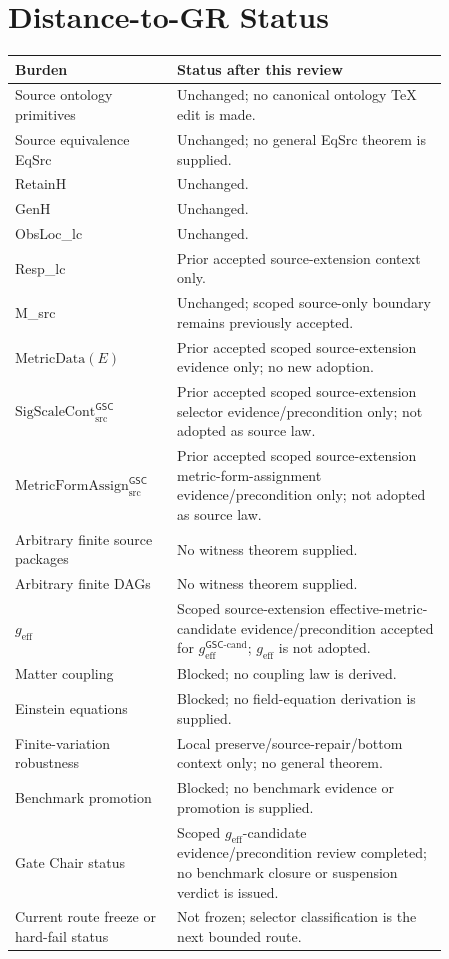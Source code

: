 \documentclass[11pt]{article}
\newcommand{\SigScaleCont}{\mathrm{SigScaleCont}^{\mathsf{GSC}}_{\mathrm{src}}}
\newcommand{\MetricFormAssign}{\mathrm{MetricFormAssign}^{\mathsf{GSC}}_{\mathrm{src}}}
\newcommand{\geff}{g_{\mathrm{eff}}}
\newcommand{\geffCand}{g_{\mathrm{eff}}^{\mathsf{GSC}\mbox{-}\mathrm{cand}}}
\begin{document}
\section{Distance-to-GR Status}

\begin{longtable}{p{0.30\linewidth}p{0.56\linewidth}}
\toprule
Burden & Status after this review \\
\midrule
Source ontology primitives & Unchanged; no canonical ontology TeX edit is made. \\
Source equivalence EqSrc & Unchanged; no general EqSrc theorem is supplied. \\
RetainH & Unchanged. \\
GenH & Unchanged. \\
ObsLoc\_lc & Unchanged. \\
Resp\_lc & Prior accepted source-extension context only. \\
M\_src & Unchanged; scoped source-only boundary remains previously accepted. \\
\(\mathrm{MetricData}(E)\) & Prior accepted scoped source-extension evidence only; no new adoption. \\
\(\SigScaleCont\) & Prior accepted scoped source-extension selector evidence/precondition only; not adopted as source law. \\
\(\MetricFormAssign\) & Prior accepted scoped source-extension metric-form-assignment evidence/precondition only; not adopted as source law. \\
Arbitrary finite source packages & No witness theorem supplied. \\
Arbitrary finite DAGs & No witness theorem supplied. \\
\(\geff\) & Scoped source-extension effective-metric-candidate evidence/precondition accepted for \(\geffCand\); \(\geff\) is not adopted. \\
Matter coupling & Blocked; no coupling law is derived. \\
Einstein equations & Blocked; no field-equation derivation is supplied. \\
Finite-variation robustness & Local preserve/source-repair/bottom context only; no general theorem. \\
Benchmark promotion & Blocked; no benchmark evidence or promotion is supplied. \\
Gate Chair status & Scoped \(\geff\)-candidate evidence/precondition review completed; no benchmark closure or suspension verdict is issued. \\
Current route freeze or hard-fail status & Not frozen; selector classification is the next bounded route. \\
\bottomrule
\end{longtable}
\end{document}
